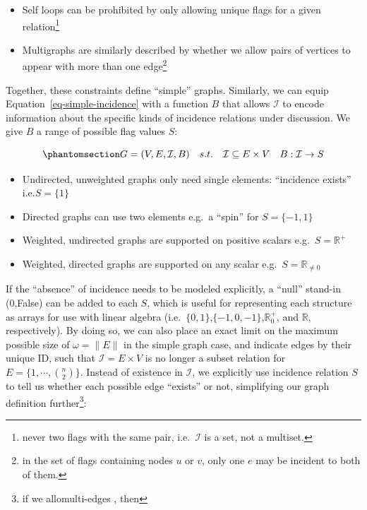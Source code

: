 \documentclass[%
	12pt,
		oneside,
		letterpaper
]{book}
\providecommand{\tightlist}{%
  \setlength{\itemsep}{0pt}\setlength{\parskip}{0pt}}\usepackage{longtable,booktabs,array}
\begin{document}
\begin{itemize}
\tightlist
\item
  Self loops can be prohibited by only allowing unique flags for a given
  relation\footnote{ never two flags with the same pair,
    i.e.~\(\mathcal{I}\) is a set, not a multiset.}
\item
  Multigraphs are similarly described by whether we allow pairs of
  vertices to appear with more than one edge\footnote{ in the set of
    flags containing nodes \(u\) or \(v\), only one \(e\) may be
    incident to both of them.}
\end{itemize}

Together, these constraints define ``simple'' graphs. Similarly, we can
equip Equation~\ref{eq-simple-incidence} with a function \(B\) that
allows \(\mathcal{I}\) to encode information about the specific kinds of
incidence relations under discussion. We give \(B\) a range of possible
flag values \(S\):

\begin{equation}\phantomsection\label{eq-map-incidence}{
G = (V,E,\mathcal{I},B) \quad s.t. \quad \mathcal{I} \subseteq E\times V\quad B:\mathcal{I}\rightarrow S
}\end{equation}

\begin{itemize}
\tightlist
\item
  Undirected, unweighted graphs only need single elements: ``incidence
  exists'' i.e.\(S=\{1\}\)
\item
  Directed graphs can use two elements e.g.~a ``spin'' for
  \(S=\{-1,1\}\)
\item
  Weighted, undirected graphs are supported on positive scalars
  e.g.~\(S=\mathbb{R}^+\)
\item
  Weighted, directed graphs are supported on any scalar
  e.g.~\(S=\mathbb{R}_{\neq0}\)
\end{itemize}

If the ``absence'' of incidence needs to be modeled explicitly, a
``null'' stand-in (0,False) can be added to each \(S\), which is useful
for representing each structure as arrays for use with linear algebra
(i.e.~\(\{0,1\}\),\(\{-1,0,-1\}\),\(\mathbb{R}^+_0\), and
\(\mathbb{R}\), respectively). By doing so, we can also place an exact
limit on the maximum possible size of \(\omega=\|E\|\) in the simple
graph case, and indicate edges by their unique ID, such that
\(\mathcal{I}= E\times V\) is no longer a subset relation for
\(E=\{1,\cdots,{n\choose2} \}\). Instead of existence in
\(\mathcal{I}\), we explicitly use incidence relation \(S\) to tell us
whether each possible edge ``exists'' or not, simplifying our graph
definition further\footnote{ if we allomulti-edges , then}:
\end{document}
